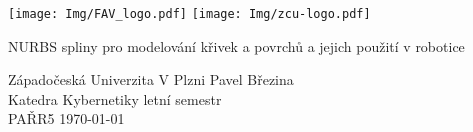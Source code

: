 \begin{center}
    \texttt{[image: Img/FAV\_logo.pdf]}
    \texttt{[image: Img/zcu-logo.pdf]}
\end{center}
\begin{center}
    \vspace{3cm}
    \LARGE{NURBS spliny pro modelování křivek a povrchů a jejich použití v robotice}
\end{center}
\vfill{}
\noindent
Západočeská Univerzita V Plzni \hfill Pavel Březina\\
Katedra Kybernetiky            \hfill letní semestr\\
PAŘR5                \hfill \today
\thispagestyle{empty}
\newpage